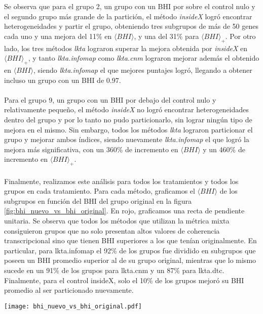 \clearpage
Se observa que para el grupo 2, un grupo con un BHI por sobre el control nulo y el segundo grupo más grande de la partición, el método \textit{insideX} logró encontrar heterogeneidades y partir el grupo, obteniendo tres subgrupos de más de 50 genes cada uno y una mejora del 11\% en $\langle BHI \rangle$, y una del 31\% para $\langle BHI \rangle _{+}$. Por otro lado, los tres métodos \textit{lkta} lograron superar la mejora obtenida por \textit{insideX} en $\langle BHI \rangle _{+}$, y tanto \textit{lkta.infomap} como \textit{lkta.cnm} lograron mejorar además el obtenido en $\langle BHI \rangle$, siendo \textit{lkta.infomap} el que mejores puntajes logró, llegando a obtener incluso un grupo con un BHI de $0.97$.\\\\
Para el grupo 9, un grupo con un BHI por debajo del control nulo y relativamente pequeño, el método \textit{insideX} no logró encontrar heterogeneidades dentro del grupo y por lo tanto no pudo particionarlo, sin lograr ningún tipo de mejora en el mismo. Sin embargo, todos los métodos \textit{lkta} lograron particionar el grupo y mejorar ambos índices, siendo nuevamente \textit{lkta.infomap} el que logró la mejora más significativa, con un 360\% de incremento en $\langle BHI \rangle$ y un 460\% de incremento en $\langle BHI \rangle _{+}$.\\\\
Finalmente, realizamos este análisis para todos los tratamientos y todos los grupos en cada tratamiento. Para cada método, graficamos el $\langle BHI \rangle$ de los subgrupos en función del BHI del grupo original en la figura \ref{fig:bhi_nuevo_vs_bhi_original}. En rojo, graficamos una recta de pendiente unitaria. Se observa que todos los métodos que utilizan la métrica mixta consiguieron grupos que no solo presentan altos valores de coherencia transcripcional sino que tienen BHI superiores a los que tenían originalmente. En particular, para lkta.infomap el 92\% de los grupos fue dividido en subgrupos que poseen un BHI promedio superior al de su grupo original, mientras que lo mismo sucede en un 91\% de los grupos para lkta.cnm y un 87\% para lkta.dtc. Finalmente, para el control insideX, solo el 10\% de los grupos mejoró su BHI promedio al ser particionado nuevamente.
\begin{center}
\texttt{[image: bhi\_nuevo\_vs\_bhi\_original.pdf]}
\label{fig:bhi_nuevo_vs_bhi_original}
\end{center}
